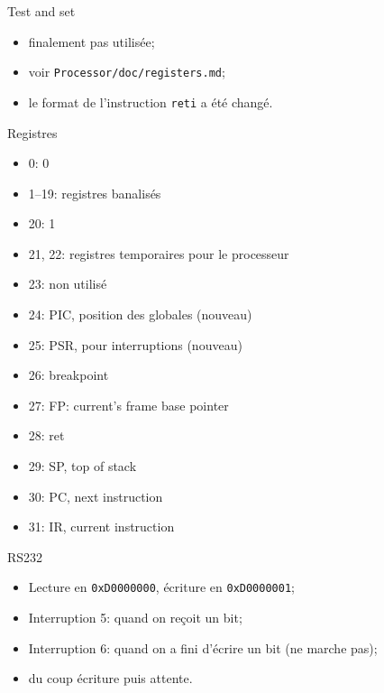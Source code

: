 \documentclass{beamer}
\begin{document}
    \begin{frame}[fragile]{Test and set}
      \begin{itemize}
        \item finalement pas utilisée;
        \item voir \verb+Processor/doc/registers.md+;
        \item le format de l'instruction \verb+reti+ a été changé.
      \end{itemize}
\end{frame}

    \begin{frame}{Registres}
      \begin{itemize}
        \item 0: 0
        \item 1--19: registres banalisés
        \item 20: 1
        \item 21, 22: registres temporaires pour le processeur
        \item 23: non utilisé
        \item 24: PIC, position des globales (nouveau)
        \item 25: PSR, pour interruptions (nouveau)
        \item 26: breakpoint
        \item 27: FP: current's frame base pointer
        \item 28: ret
        \item 29: SP, top of stack
        \item 30: PC, next instruction
        \item 31: IR, current instruction
      \end{itemize}
    \end{frame}

    \begin{frame}[fragile]{RS232}
      \begin{itemize}
        \item Lecture en \verb+0xD0000000+, écriture en \verb+0xD0000001+;
        \item Interruption 5: quand on reçoit un bit;
        \item Interruption 6: quand on a fini d'écrire un bit (ne marche pas);
          \pause
        \item du coup écriture puis attente.
      \end{itemize}
\end{frame}
\end{document}
